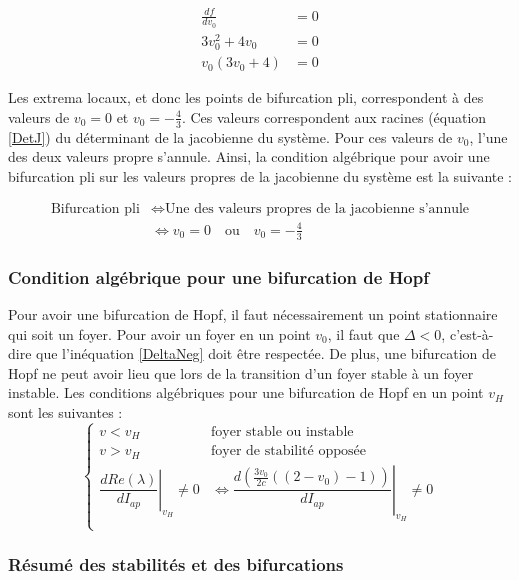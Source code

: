 \documentclass[12pt,a4paper,onecolumn]{article}
\begin{document}
\begin{align*}
\frac{df}{dv_0} &= 0 \tag*{Extremum local} \\
3v_0^2 + 4v_0 &= 0\\
v_0(3v_0 + 4) &= 0
\end{align*}

Les extrema locaux, et donc les points de bifurcation pli, correspondent à des valeurs de $v_0 = 0$ et $v_0 = -\frac{4}{3}$. Ces valeurs correspondent aux racines (équation \ref{DetJ}) du déterminant de la jacobienne du système. Pour ces valeurs de $v_0$, l'une des deux valeurs propre s'annule. Ainsi, la condition algébrique pour avoir une bifurcation pli sur les valeurs propres de la jacobienne du système est la suivante :

\begin{align}
\text{Bifurcation pli} &\Leftrightarrow \text{Une des valeurs propres de la jacobienne s'annule} \nonumber\\
&\Leftrightarrow v_0 = 0 \quad \text{ou}\quad v_0 = -\frac{4}{3} \label{Bifpli}
\end{align}


\subsubsection{Condition algébrique pour une bifurcation de Hopf}

Pour avoir une bifurcation de Hopf, il faut nécessairement un point stationnaire qui soit un foyer. Pour avoir un foyer en un point $v_0$, il faut que $\Delta < 0$, c'est-à-dire que l'inéquation \ref{DeltaNeg} doit être respectée. De plus, une bifurcation de Hopf ne peut avoir lieu que lors de la transition d'un foyer stable à un foyer instable. Les conditions algébriques pour une bifurcation de Hopf en un point $v_H$ sont les suivantes :
\begin{equation}
	\left\{
		\begin{array}{ll}
			v < v_H & \text{foyer stable ou instable}\\
			v > v_H & \text{foyer de stabilité opposée}\\
			\left.\dfrac{dRe(\lambda)}{dI_{ap}}\right|_{v_H} \ne 0 &  \Leftrightarrow \left.\dfrac{d\left(\frac{3v_0}{2c}((2-v_0) - 1)\right)}{dI_{ap}}\right|_{v_H} \ne 0\\
		\end{array}
	\right.
\label{BifHopf}
\end{equation}

\subsubsection{Résumé des stabilités et des bifurcations}
\end{document}
